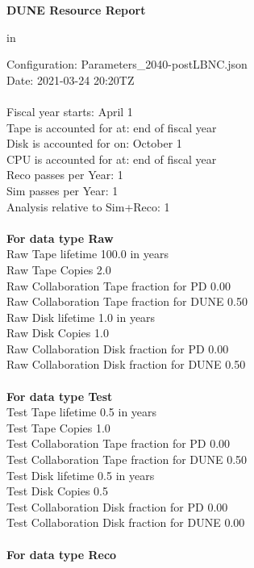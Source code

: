 \documentclass[12pt]{article}
\begin{document}
\parindent=0pt
\setlength{\textwidth=7.0 in}
\setlength{\oddsidemargin=0.00 in}
\setlength{\topmargin=0 in}
\setlength{\textheight=9.5 in}
\centerline{\bf{DUNE Resource Report}} in \par Configuration: Parameters\_2040-postLBNC.json\\  Date: 2021-03-24 20:20TZ\\   \\  Fiscal year starts: April 1\\ 
Tape is accounted for at: end of fiscal year\\ 
Disk is accounted for on: October 1\\ 
CPU is accounted for at: end of fiscal year\\ 
Reco passes per Year: 1\\
Sim passes per Year: 1\\
Analysis relative to Sim+Reco: 1\\
\pagebreak
\\
{\bf For data type Raw}\\
   Raw Tape lifetime 100.0 in years\\
   Raw Tape Copies   2.0\\
   Raw Collaboration Tape fraction for PD  0.00\\
   Raw Collaboration Tape fraction for DUNE  0.50\\
   Raw Disk lifetime   1.0 in years\\
   Raw Disk Copies   1.0\\
   Raw Collaboration Disk fraction for PD  0.00\\
   Raw Collaboration Disk fraction for DUNE  0.50\\
\\
{\bf For data type Test}\\
  Test Tape lifetime   0.5 in years\\
  Test Tape Copies   1.0\\
  Test Collaboration Tape fraction for PD  0.00\\
  Test Collaboration Tape fraction for DUNE  0.50\\
  Test Disk lifetime   0.5 in years\\
  Test Disk Copies   0.5\\
  Test Collaboration Disk fraction for PD  0.00\\
  Test Collaboration Disk fraction for DUNE  0.00\\
\\
{\bf For data type Reco}\\
\end{document}
